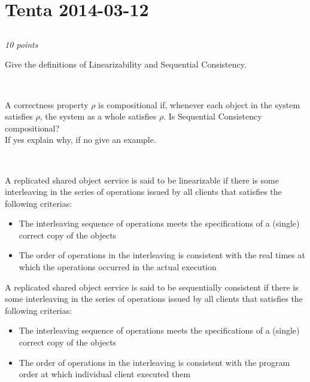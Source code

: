 \documentclass[a4paper]{article}
\newcommand{\points}[1]{\subsection{} \textit{#1 points}\\}
\newcommand{\question}[2][]{
  \parbox[t]{\textwidth}{
    \ifthenelse{\equal{#1}{}}{}{#1)}
    \parbox[t]{0.95\textwidth}{#2}}\\}
\newcommand{\solution}[2][]{
  \ifthenelse{\equal{#1}{} \or \equal{#1}{a}}{\\[3pt]\textit{Solution: }\\[0.1cm]}{}
  \parbox[t]{\textwidth}{
    \ifthenelse{\equal{#1}{}}{}{#1)}
    \parbox[t]{0.95\textwidth}{#2}}\\
}
\newcommand{\highlight}[1]{{\color{blue}#1}}
\begin{document}
\section{Tenta 2014-03-12}
\points{10}
\label{2014-03:linearizability}
\question[a]{
  Give the definitions of Linearizability and Sequential Consistency.
}
\question[b]{
  A correctness property $\rho$ is compositional if, whenever
  each object in the system satisfies $\rho$, the system as a whole
  satisfies $\rho$. Is Sequential Consistency compositional? \\
  If yes explain why, if no give an example.
}
\solution[a]{
  A replicated shared object service is said to be
  \highlight{linearizable} if there is some interleaving in the series
  of operations issued by all clients that satisfies the following
  criterias:
  \begin{itemize}
    \item{The interleaving sequence of operations meets the
        specifications of a (single) correct copy of the objects}
    \item{The order of operations in the interleaving is consistent
        with the \highlight{real times at which the operations occurred
          in the actual execution}}
  \end{itemize}

  A replicated shared object service is said to be
  \highlight{sequentially consistent} if there is some interleaving in
  the series of operations issued by all clients that satisfies the
  following criterias:
  \begin{itemize}
    \item{The interleaving sequence of operations meets the
        specifications of a (single) correct copy of the objects}
  \item{The order of operations in the interleaving is consistent with
      the \highlight{program order at which individual client executed
        them}}
  \end{itemize}
}
\end{document}
